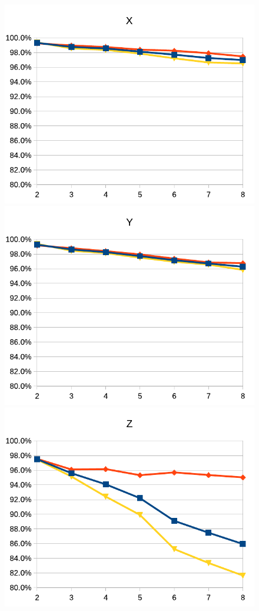 \documentclass{InsightArticle}
\begin{document}
\begin{figure}[htb]
\center
\includegraphics[scale=0.65]{c10l-x.pdf}
\includegraphics[scale=0.65]{c10l-y.pdf}
\includegraphics[scale=0.65]{c10l-z.pdf}

\end{figure}
\end{document}
